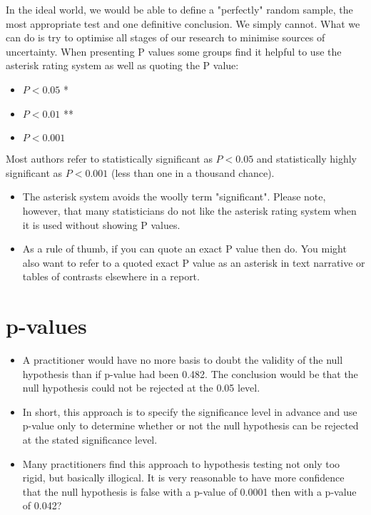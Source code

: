 \documentclass[]{report}
\begin{document}
	
	In the ideal world, we would be able to define a "perfectly" random sample, the most appropriate test and one definitive conclusion. We simply cannot. What we can do is try to optimise all stages of our research to minimise sources of uncertainty. When presenting P values some groups find it helpful to use the asterisk rating system as well as quoting the P value:
	
	\begin{itemize}
		\item $P < 0.05$ *
		\item $P < 0.01$ **
		\item $P < 0.001$
	\end{itemize}
	
	Most authors refer to statistically significant as $P < 0.05$ and statistically highly significant as $P < 0.001$ (less than one in a thousand chance).
	
	\begin{itemize}
		\item The asterisk system avoids the woolly term "significant". Please note, however, that many statisticians do not like the asterisk rating system when it is used without showing P values. 
		\item As a rule of thumb, if you can quote an exact P value then do. You might also want to refer to a quoted exact P value as an asterisk in text narrative or tables of contrasts elsewhere in a report.
	\end{itemize}
	
	
	
	\section{p-values}
	\begin{itemize}
		\item A practitioner would have no more basis to doubt the validity of the null hypothesis than if p-value had been 0.482. The conclusion would be that the null hypothesis could not be rejected at the 0.05 level. \item In short, this approach is to specify the significance level in advance and use p-value only to determine whether or not the null hypothesis can be rejected at the stated significance level.
		\item
		Many practitioners find this approach to hypothesis testing not only too rigid, but basically illogical. It is very reasonable to  have more confidence that the null hypothesis is false with a p-value of 0.0001 then with a p-value of 0.042?
	\end{itemize}
	
\end{document}
